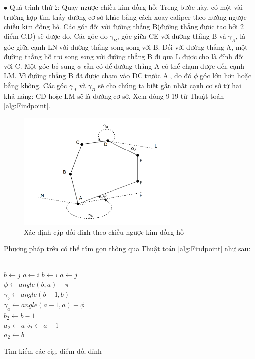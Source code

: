 $\bullet$ Quá trình thứ 2: Quay ngược chiều kim đồng hồ:
Trong bước này, có một vài trường hợp tìm thấy đường cơ sở khác bằng cách xoay caliper theo hướng ngược chiều kim đồng hồ.  Các góc đối với đường thẳng B(đường thẳng được tạo bởi 2 điểm C,D) sẽ được đo. Các góc đo $\gamma_{B}$, góc giữa CE với đường thẳng B và $\gamma_{A}$, là góc giữa cạnh LN với đường thẳng song song với B.  Đối với đường thẳng A, một đường thẳng hỗ trợ song song với đường thẳng B  đi qua L được cho là đỉnh đối với C. Một góc bổ sung $\phi$ cần có để đường thẳng A có thể chạm được đến cạnh LM. Vì đường thẳng B đã được chạm vào DC  trước A , do đó $\phi$ góc lớn hơn hoặc bằng không.
Các góc $\gamma_{A}$ và $\gamma_{B}$ sẽ cho chúng ta biết gần nhất cạnh cơ sở  từ hai khả năng: CD hoặc LM sẽ là đường cơ sở. Xem dòng 9-19 từ Thuật toán \ref{alg:Findpoint}.
    \begin{figure}[h]
        \centering
        \includegraphics[width=0.7\textwidth]{chapter4/image/anh4.png}
        \caption{Xác định cặp đối đỉnh theo chiều ngược kim đồng hồ}
        \label{fig:anh3}
    \end{figure}

Phương pháp trên có thể tóm gọn thông qua Thuật toán \ref{alg:Findpoint} như sau: \\

\begin{algorithm}
\KwResult{$\rho$}
{
\\
{
    $b \gets j$\;
    $a \gets i$\;
}   
\Else
{
    $b \gets i$\;
    $a \gets j$\;
}
 \\
$\phi \gets angle(b,a)-\pi $\\
$\gamma_{b} \gets angle(b-1,b) $\\
$\gamma_{a} \gets angle(a-1,a) - \phi $\\
    {
        $b_{2} \gets b-1$\\
        $a_{2} \gets a$
    }  
    \Else
    {
        $b_{2} \gets a-1$\\
        $a_{2} \gets b$
    }
}
\caption{Tìm kiếm các cặp điểm đối đỉnh}
\label{alg:Findpoint} 
\end{algorithm}

